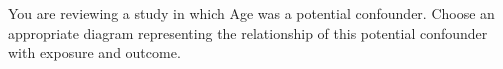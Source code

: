 
You are reviewing a study in which Age was a potential confounder.  Choose an appropriate diagram representing the relationship of this potential confounder with exposure and outcome.

\begin{MultipleChoice}
\end{MultipleChoice}
